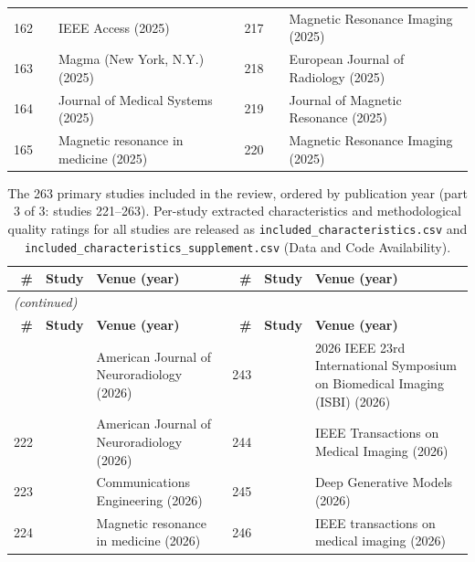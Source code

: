 \documentclass[11pt]{article}
\begin{document}
{\begin{longtable}{r l p{} r l p{}}
162 & \cite{angella2025dima} & IEEE Access (2025) & 217 & \cite{nagaraj2025evaluation} & Magnetic Resonance Imaging (2025) \\
163 & \cite{liebrand2025deep} & Magma (New York, N.Y.) (2025) & 218 & \cite{takada2025impact} & European Journal of Radiology (2025) \\
164 & \cite{giulio2025diffusion} & Journal of Medical Systems (2025) & 219 & \cite{huang2025improve} & Journal of Magnetic Resonance (2025) \\
165 & \cite{cerjanic2025elastographic} & Magnetic resonance in medicine (2025) & 220 & \cite{harada2025verification} & Magnetic Resonance Imaging (2025) \\
\hline
\end{longtable}}

{\def\baselinestretch{1}\scriptsize
\setlength{\tabcolsep}{3pt}
\renewcommand{\arraystretch}{1.06}
\begin{longtable}{r l p{} r l p{}}
\caption{The 263 primary studies included in the review, ordered by publication year (part 3 of 3: studies 221--263). Per-study extracted characteristics and methodological quality ratings for all studies are released as \texttt{included\_characteristics.csv} and \texttt{included\_characteristics\_supplement.csv} (Data and Code Availability).}\label{tab:supp_included_3}\\
\hline
\textbf{\#} & \textbf{Study} & \textbf{Venue (year)} & \textbf{\#} & \textbf{Study} & \textbf{Venue (year)} \\
\hline
\endfirsthead
\multicolumn{6}{l}{\footnotesize\emph{(continued)}}\\
\hline
\textbf{\#} & \textbf{Study} & \textbf{Venue (year)} & \textbf{\#} & \textbf{Study} & \textbf{Venue (year)} \\
\hline
\endhead
\hline
\endfoot
221 & \cite{bathla2025deeplearning} & American Journal of Neuroradiology (2026) & 243 & \cite{abed2026mriqt} & 2026 IEEE 23rd International Symposium on Biomedical Imaging (ISBI) (2026) \\
222 & \cite{fujita2025motioninformed} & American Journal of Neuroradiology (2026) & 244 & \cite{ortizgonzalez2026motiondps} & IEEE Transactions on Medical Imaging (2026) \\
223 & \cite{huabing2026accelerating} & Communications Engineering (2026) & 245 & \cite{shen2026realdeal} & Deep Generative Models (2026) \\
224 & \cite{xiong2026advancing} & Magnetic resonance in medicine (2026) & 246 & \cite{rassmann2026regression} & IEEE transactions on medical imaging (2026) \\

\end{longtable}}
\end{document}
